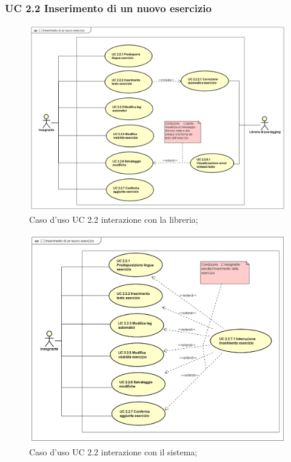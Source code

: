 \subsubsection{UC 2.2 Inserimento di un nuovo esercizio}

\begin{figure}[H]
	\centering
	\includegraphics[width=17cm]{img/UC22LIBRERIA.png} 
	\caption{Caso d'uso UC 2.2 interazione con la libreria;}
\end{figure}


\begin{figure}[H]
	\centering
	\includegraphics[width=17cm]{img/UC22SISTEMA.png} 
	\caption{Caso d'uso UC 2.2 interazione con il sistema;}
\end{figure}

